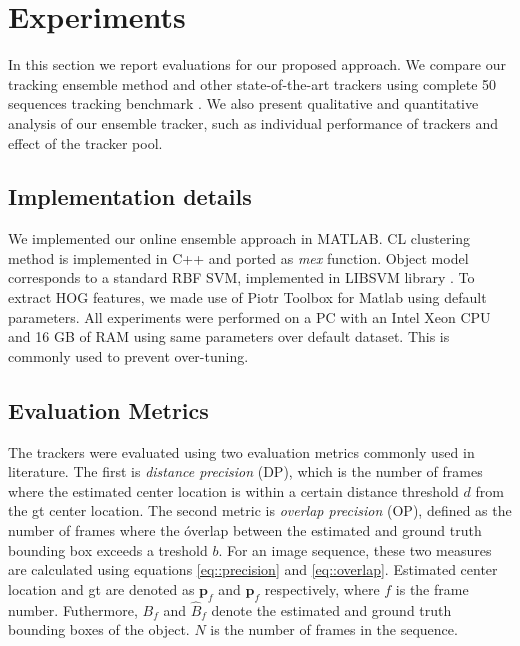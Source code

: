 \chapter{Experiments} %

\label{chapter4} %

\label{chapter::experiments}

In this section we report evaluations for our proposed approach. We compare our
tracking ensemble method and other state-of-the-art trackers using complete
50 sequences tracking benchmark \cite{Wu2013B}. We also present qualitative and
quantitative analysis of our ensemble tracker, such as
individual performance of trackers and effect of the tracker pool.

\section{Implementation details}
We implemented our online ensemble approach in MATLAB. CL clustering method is
implemented in C++ and ported as \textit{mex} function. Object model corresponds
to a standard RBF SVM, implemented in LIBSVM library \cite{libsvm}. To extract
HOG features, we made use of Piotr Toolbox for Matlab \cite{PMT} using default parameters. All experiments were performed on a PC with an Intel Xeon CPU and
16 GB of RAM using same parameters over default dataset. This is commonly used
to prevent over-tuning.

\section{Evaluation Metrics}
The trackers were evaluated using two evaluation metrics commonly used in
literature. The first is \textit{distance precision} (DP), which is the number
of frames where the estimated center location is within a certain distance
threshold $d$ from the \gls{gt} center location. The second metric is
\textit{overlap precision} (OP), defined as the number of frames where the
óverlap between the estimated and ground truth bounding box exceeds
a treshold $b$. For an image sequence, these two measures are calculated using
equations \ref{eq::precision} and \ref{eq::overlap}. Estimated center location
and \gls{gt} are denoted as $\mathbf{p}_f$ and $\mathbf{\hat{p}}_f$
respectively, where $f$ is the frame number. Futhermore, $B_f$ and $\hat{B}_f$
denote the estimated and ground truth bounding boxes of the object. $N$ is the
number of frames in the sequence.

